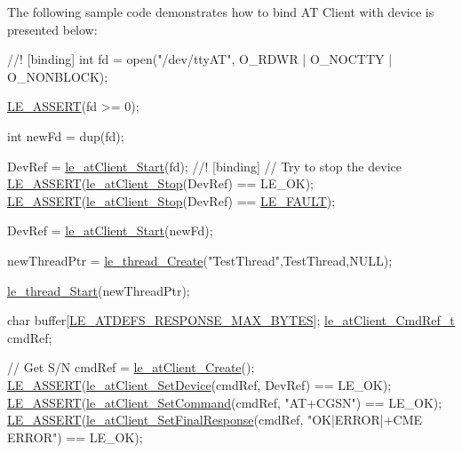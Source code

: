The following sample code demonstrates how to bind AT Client with device is presented below\+: 
\begin{DoxyCodeInclude}
\textcolor{comment}{    //! [binding]}
\textcolor{comment}{}    \textcolor{keywordtype}{int} fd = open(\textcolor{stringliteral}{"/dev/ttyAT"}, O\_RDWR | O\_NOCTTY | O\_NONBLOCK);

    \hyperlink{le__log_8h_ac0dbbef91dc0fed449d0092ff0557b39}{LE\_ASSERT}(fd >= 0);

    \textcolor{keywordtype}{int} newFd = dup(fd);

    DevRef = \hyperlink{le__at_client__interface_8h_a58f48ecb3c1569a4b68be4006a751f36}{le\_atClient\_Start}(fd);\textcolor{comment}{}
\textcolor{comment}{    //! [binding]}
\textcolor{comment}{}
    \textcolor{comment}{// Try to stop the device}
    \hyperlink{le__log_8h_ac0dbbef91dc0fed449d0092ff0557b39}{LE\_ASSERT}(\hyperlink{le__at_client__interface_8h_a1cf248c81134ae44639ab62e3c501cf1}{le\_atClient\_Stop}(DevRef) == LE\_OK);
    \hyperlink{le__log_8h_ac0dbbef91dc0fed449d0092ff0557b39}{LE\_ASSERT}(\hyperlink{le__at_client__interface_8h_a1cf248c81134ae44639ab62e3c501cf1}{le\_atClient\_Stop}(DevRef) == \hyperlink{le__basics_8h_a1cca095ed6ebab24b57a636382a6c86cac409634423b6b1ef09643529f6224798}{LE\_FAULT});

    DevRef = \hyperlink{le__at_client__interface_8h_a58f48ecb3c1569a4b68be4006a751f36}{le\_atClient\_Start}(newFd);

    newThreadPtr = \hyperlink{le__thread_8h_a87e02a46f92e9e3e11ed28a2b265872f}{le\_thread\_Create}(\textcolor{stringliteral}{"TestThread"},TestThread,NULL);

    \hyperlink{le__thread_8h_a38df3877ee5ab9fac17b2fc0be46c27e}{le\_thread\_Start}(newThreadPtr);

    \textcolor{keywordtype}{char} buffer[\hyperlink{le__at_defs__interface_8h_acbaa10c00b1ff1250d2b7338225ea9ea}{LE\_ATDEFS\_RESPONSE\_MAX\_BYTES}];
    \hyperlink{le__at_client__interface_8h_ab12f48d1655a83a00bd4b2026318a6ad}{le\_atClient\_CmdRef\_t} cmdRef;

    \textcolor{comment}{// Get S/N}
    cmdRef = \hyperlink{le__at_client__interface_8h_aead1c543cd8e65d1ad531233af2c7529}{le\_atClient\_Create}();
    \hyperlink{le__log_8h_ac0dbbef91dc0fed449d0092ff0557b39}{LE\_ASSERT}(\hyperlink{le__at_client__interface_8h_a44588125903f97d422ea14c5fd534683}{le\_atClient\_SetDevice}(cmdRef, DevRef) == LE\_OK);
    \hyperlink{le__log_8h_ac0dbbef91dc0fed449d0092ff0557b39}{LE\_ASSERT}(\hyperlink{le__at_client__interface_8h_a156e43a17cd85dee38fb7ae4182e8864}{le\_atClient\_SetCommand}(cmdRef, \textcolor{stringliteral}{"AT+CGSN"}) == LE\_OK);
    \hyperlink{le__log_8h_ac0dbbef91dc0fed449d0092ff0557b39}{LE\_ASSERT}(\hyperlink{le__at_client__interface_8h_a99062518237b59b56faf45f8511419e9}{le\_atClient\_SetFinalResponse}(cmdRef, \textcolor{stringliteral}{"OK|ERROR|+CME
       ERROR"}) == LE\_OK);
\end{DoxyCodeInclude}
